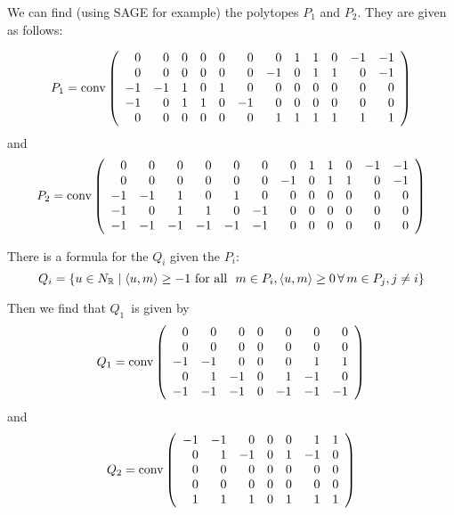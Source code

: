 \documentclass[11pt, english]{article}
\begin{document}
We can find (using SAGE for example) the polytopes $P_1$ and $P_2$. They are given as follows:

\begin{equation}
P_1 = \operatorname{conv}
\left(\begin{array}{rrrrrrrrrrrr}
0 & 0 & 0 & 0 & 0 & 0 & 0 & 1 & 1 & 0 & -1 & -1 \\
0 & 0 & 0 & 0 & 0 & 0 & -1 & 0 & 1 & 1 & 0 & -1 \\
-1 & -1 & 1 & 0 & 1 & 0 & 0 & 0 & 0 & 0 & 0 & 0 \\
-1 & 0 & 1 & 1 & 0 & -1 & 0 & 0 & 0 & 0 & 0 & 0 \\
0 & 0 & 0 & 0 & 0 & 0 & 1 & 1 & 1 & 1 & 1 & 1
\end{array}\right)
\end{equation}
and
\begin{equation}
P_2 = \operatorname{conv} \left(\begin{array}{rrrrrrrrrrrr}
0 & 0 & 0 & 0 & 0 & 0 & 0 & 1 & 1 & 0 & -1 & -1 \\
0 & 0 & 0 & 0 & 0 & 0 & -1 & 0 & 1 & 1 & 0 & -1 \\
-1 & -1 & 1 & 0 & 1 & 0 & 0 & 0 & 0 & 0 & 0 & 0 \\
-1 & 0 & 1 & 1 & 0 & -1 & 0 & 0 & 0 & 0 & 0 & 0 \\
-1 & -1 & -1 & -1 & -1 & -1 & 0 & 0 & 0 & 0 & 0 & 0
\end{array}\right)
\end{equation}

There is a formula for the $Q_i$ given the $P_i$:
$$
Q_i = \{ u \in N_\R \mid \langle u,m \rangle \geq -1 \text{ for all } m \in P_i, \langle u,m\rangle \geq 0 \, \forall \, m \in P_j, j\neq i \}
$$

Then we find that $Q_1$ is given by
\begin{equation}
Q_1 = \operatorname{conv} \left(\begin{array}{rrrrrrr}
0 & 0 & 0 & 0 & 0 & 0 & 0 \\
0 & 0 & 0 & 0 & 0 & 0 & 0 \\
-1 & -1 & 0 & 0 & 0 & 1 & 1 \\
0 & 1 & -1 & 0 & 1 & -1 & 0 \\
-1 & -1 & -1 & 0 & -1 & -1 & -1
\end{array}\right)
\end{equation}
and
\begin{equation}
Q_2 = \operatorname{conv} \left(\begin{array}{rrrrrrr}
-1 & -1 & 0 & 0 & 0 & 1 & 1 \\
0 & 1 & -1 & 0 & 1 & -1 & 0 \\
0 & 0 & 0 & 0 & 0 & 0 & 0 \\
0 & 0 & 0 & 0 & 0 & 0 & 0 \\
1 & 1 & 1 & 0 & 1 & 1 & 1
\end{array}\right)
\end{equation}
\end{document}
